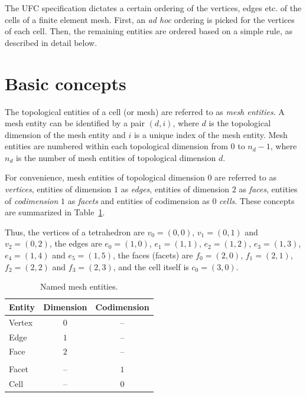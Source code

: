 The UFC specification dictates a certain ordering of the vertices,
edges etc. of the cells of a finite element mesh. First, an \emph{ad
hoc} ordering is picked for the vertices of each cell. Then, the
remaining entities are ordered based on a simple rule, as described in
detail below.

\section{Basic concepts}

The topological entities of a cell (or mesh) are referred to as
\emph{mesh entities}. A mesh entity can be identified by a pair
$(d, i)$, where $d$ is the topological dimension of the mesh entity and $i$
is a unique index of the mesh entity. Mesh entities are numbered
within each topological dimension from $0$ to $n_d-1$, where $n_d$ is
the number of mesh entities of topological dimension $d$.

For convenience, mesh entities of topological dimension $0$ are
referred to as \emph{vertices}, entities of dimension $1$
as \emph{edges}, entities of dimension $2$ as \emph{faces}, entities of
\emph{codimension} $1$ as \emph{facets} and entities of codimension as
$0$ \emph{cells}. These concepts are summarized in
Table~\ref{tab:entities}.

Thus, the vertices of a tetrahedron are
$v_0 = (0, 0)$, $v_1 = (0, 1)$ and $v_2 = (0, 2)$,
the edges are
$e_0 = (1, 0)$, $e_1 = (1, 1)$, $e_2 = (1, 2)$,
$e_3 = (1, 3)$, $e_4 = (1, 4)$ and $e_5 = (1, 5)$,
the faces (facets) are
$f_0 = (2, 0)$, $f_1 = (2, 1)$, $f_2 = (2, 2)$ and $f_3 = (2, 3)$,
and the cell itself is
$c_0 = (3, 0)$.

\begin{table}[H]
\linespread{1.2}\selectfont
  \begin{center}
    \begin{tabular}{|l|c|c|}
      \hline
      Entity & Dimension & Codimension \\
      \hline
      Vertex & $0$       & -- \\
      Edge   & $1$       & -- \\
      Face   & $2$       & -- \\
      & & \\
      Facet  & --      &  $1$ \\
      Cell   & --      &  $0$ \\
      \hline
    \end{tabular}
    \caption{Named mesh entities.}
    \label{tab:entities}
  \end{center}
\end{table}

